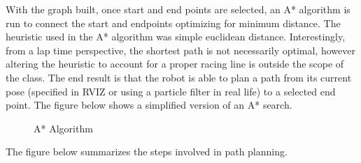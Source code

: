 \documentclass{article}
\begin{document}
With the graph built, once start and end points are selected, an A* algorithm is run to connect the start and endpoints optimizing for minimum distance. The heuristic used in the A* algorithm was simple euclidean distance. Interestingly, from a lap time perspective, the shortest path is not necessarily optimal, however altering the heuristic to account for a proper racing line is outside the scope of the class. The end result is that the robot is able to plan a path from its current pose (specified in RVIZ or using a particle filter in real life) to a selected end point. The figure below shows a simplified version of an A* search.

\begin{figure}[H]
  \centering
  \caption{A* Algorithm}
  \label{fig:example_graph_start_end}
\end{figure}

\vspace{1cm}
The figure below summarizes the steps involved in path planning. 
\vspace{1cm}
\end{document}
